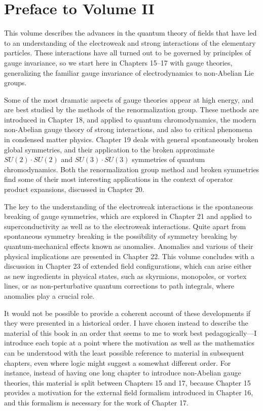 \section*{Preface to Volume II}

This volume describes the advances in the quantum theory of fields that have
led to an understanding of the electroweak and strong interactions of the
elementary particles. These interactions have all turned out to be governed by
principles of gauge invariance, so we start here in Chapters 15--17 with gauge
theories, generalizing the familiar gauge invariance of electrodynamics to
non-Abelian Lie groups.

Some of the most dramatic aspects of gauge theories appear at high energy, and
are best studied by the methods of the renormalization group. These methods are
introduced in Chapter 18, and applied to quantum chromodynamics, the modern
non-Abelian gauge theory of strong interactions, and also to critical phenomena
in condensed matter physics. Chapter 19 deals with general spontaneously broken
global symmetries, and their application to the broken approximate
$SU(2)\cdot SU(2)$ and $SU(3)\cdot SU(3)$ symmetries of quantum chromodynamics.
Both the renormalization group method and broken symmetries find some of their
most interesting applications in the context of operator product expansions,
discussed in Chapter 20.

The key to the understanding of the electroweak interactions is the spontaneous
breaking of gauge symmetries, which are explored in Chapter 21 and applied to
superconductivity as well as to the electroweak interactions. Quite apart from
spontaneous symmetry breaking is the possibility of symmetry breaking by
quantum-mechanical effects known as anomalies. Anomalies and various of their
physical implications are presented in Chapter 22. This volume concludes with a
discussion in Chapter 23 of extended field configurations, which can arise
either as new ingredients in physical states, such as skyrmions, monopoles, or
vortex lines, or as non-perturbative quantum corrections to path integrals,
where anomalies play a crucial role.

It would not be possible to provide a coherent account of these developments if
they were presented in a historical order. I have chosen instead to describe
the material of this book in an order that seems to me to work best
pedagogically---I introduce each topic at a point where the motivation as well
as the mathematics can be understood with the least possible reference to
material in subsequent chapters, even where logic might suggest a somewhat
different order. For instance, instead of having one long chapter to introduce
non-Abelian gauge theories, this material is split between Chapters 15 and 17,
because Chapter 15 provides a motivation for the external field formalism
introduced in Chapter 16, and this formalism is necessary for the work of
Chapter 17.

